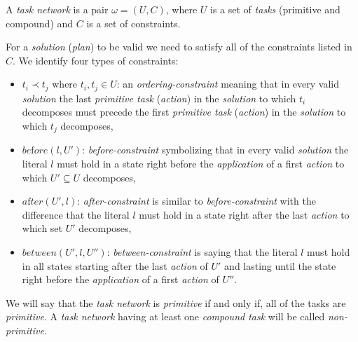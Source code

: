 \begin{defn}\label{def02:9}
    A \emph{task network} is a pair $\omega = (U,C)$, where $U$ is a set of \emph{tasks} (primitive and compound) and $C$ is a set of constraints.
    
    For a \emph{solution} (\emph{plan}) to be valid we need to satisfy all of the constraints listed in $C$. We identify four types of constraints:

    \begin{itemize}
        \item $t_i \prec t_j$ where $t_i,t_j \in U$: an \emph{ordering-constraint} meaning that in every valid \emph{solution} the last \emph{primitive task} (\emph{action}) in the \emph{solution} to which $t_i$ decomposes must precede the first \emph{primitive task} (\emph{action}) in the \emph{solution} to which $t_j$ decomposes,
        
        \item $be\text{f}ore(l,U')$: \emph{before-constraint} symbolizing that in every valid \emph{solution} the literal $l$ must hold in a state right before the \emph{application} of a first \emph{action} to which $U' \subseteq U$ decomposes,
    
        \item $a\text{f}ter(U',l)$: \emph{after-constraint} is similar to \emph{before-constraint} with the difference that the literal $l$ must hold in a state right after the last \emph{action} to which set $U'$ decomposes,
    
        \item $between(U',l,U'')$: \emph{between-constraint} is saying that the literal $l$ must hold in all states starting after the last \emph{action} of $U'$ and lasting until the state right before the \emph{application} of a first \emph{action} of $U''$.
    \end{itemize}

    We will say that the \emph{task network} is \emph{primitive} if and only if, all of the tasks are \emph{primitive}. A \emph{task network} having at least one \emph{compound task} will be called \emph{non-primitive}.
\end{defn}

